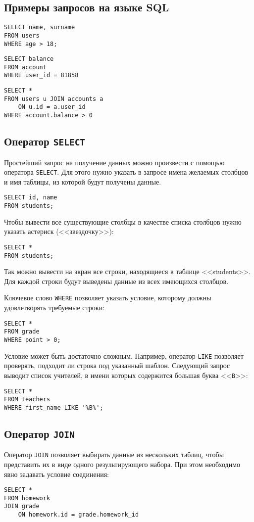 \subsection{Примеры запросов на языке SQL}

\begin{verbatim}
SELECT name, surname
FROM users
WHERE age > 18;
\end{verbatim}

\begin{verbatim}
SELECT balance
FROM account
WHERE user_id = 81858
\end{verbatim}

\begin{verbatim}
SELECT *
FROM users u JOIN accounts a
    ON u.id = a.user_id
WHERE account.balance > 0
\end{verbatim}

\subsection{Оператор \texttt{SELECT}}
Простейший запрос на получение данных можно произвести с помощью оператора \verb|SELECT|. Для этого нужно указать в запросе имена желаемых столбцов и имя таблицы, из которой будут получены данные.
\begin{verbatim}
SELECT id, name
FROM students;
\end{verbatim}
Чтобы вывести все существующие столбцы в качестве списка столбцов нужно указать
астериск (<<звездочку>>):
\begin{verbatim}
SELECT *
FROM students;
\end{verbatim}
Так можно вывести на экран все строки, находящиеся в таблице <<students>>.
Для каждой строки будут выведены данные из всех имеющихся столбцов.

Ключевое слово \verb|WHERE| позволяет указать условие, которому должны удовлетворять требуемые строки:
\begin{verbatim}
SELECT *
FROM grade
WHERE point > 0;
\end{verbatim}
Условие может быть достаточно сложным. Например, оператор \verb|LIKE| позволяет проверять, подходит ли строка под указанный шаблон. Следующий запрос выводит список учителей, в имени которых содержится большая буква <<\verb|B|>>:
\begin{verbatim}
SELECT *
FROM teachers
WHERE first_name LIKE '%B%';
\end{verbatim}

\subsection{Оператор \texttt{JOIN}}
Оператор \verb|JOIN| позволяет выбирать данные из нескольких таблиц, чтобы представить их в виде одного результирующего набора. При этом необходимо явно задавать условие соединения:
\begin{verbatim}
SELECT *
FROM homework
JOIN grade
    ON homework.id = grade.homework_id
\end{verbatim}


